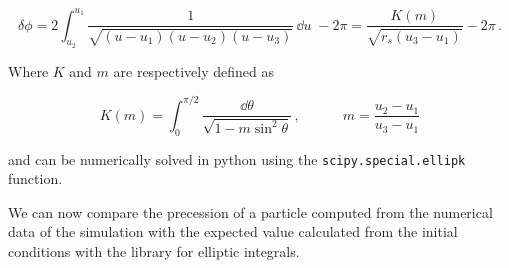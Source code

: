 \begin{equation}
    \delta \phi = 2 \int_{u_2}^{u_1} \frac{1}{\sqrt{(u - u_1)(u - u_2)(u - u_3)}}
    \, \dd{u} \; - 2 \pi
    = \frac{K(m)}{\sqrt{r_s (u_3 - u_1)}} - 2 \pi \, .
\end{equation}

Where $K$ and $m$ are respectively defined as

\begin{equation}
    K(m) = \int_0^{\pi/2} \frac{\dd{\theta}}{\sqrt{1 - m \sin^2 \theta}} \, ,
    \quad \quad \quad
    m = \frac{u_2 - u_1}{u_3 - u_1}
\end{equation}

and can be numerically solved in python using the \texttt{scipy.special.ellipk}
function.

We can now compare the precession of a particle computed from the numerical data
of the simulation with the expected value calculated from the initial conditions
with the library for elliptic integrals.


